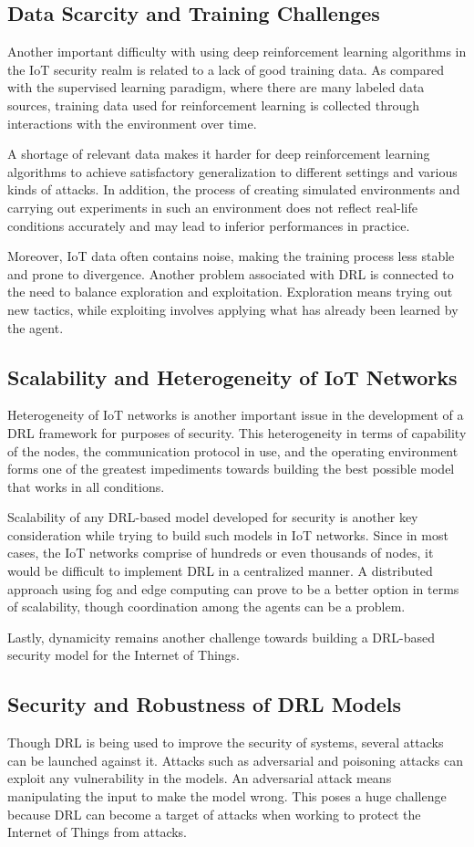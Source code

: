 \documentclass[12pt]{article}
\begin{document}
\subsection{Data Scarcity and Training Challenges}
Another important difficulty with using deep reinforcement learning algorithms in the IoT security realm is related to a lack of good training data. As compared with the supervised learning paradigm, where there are many labeled data sources, training data used for reinforcement learning is collected through interactions with the environment over time.

A shortage of relevant data makes it harder for deep reinforcement learning algorithms to achieve satisfactory generalization to different settings and various kinds of attacks. In addition, the process of creating simulated environments and carrying out experiments in such an environment does not reflect real-life conditions accurately and may lead to inferior performances in practice.

Moreover, IoT data often contains noise, making the training process less stable and prone to divergence. Another problem associated with DRL is connected to the need to balance exploration and exploitation. Exploration means trying out new tactics, while exploiting involves applying what has already been learned by the agent.
\subsection{Scalability and Heterogeneity of IoT Networks}
Heterogeneity of IoT networks is another important issue in the development of a DRL framework for purposes of security. This heterogeneity in terms of capability of the nodes, the communication protocol in use, and the operating environment forms one of the greatest impediments towards building the best possible model that works in all conditions.

Scalability of any DRL-based model developed for security is another key consideration while trying to build such models in IoT networks. Since in most cases, the IoT networks comprise of hundreds or even thousands of nodes, it would be difficult to implement DRL in a centralized manner. A distributed approach using fog and edge computing can prove to be a better option in terms of scalability, though coordination among the agents can be a problem.

Lastly, dynamicity remains another challenge towards building a DRL-based security model for the Internet of Things.
\subsection{Security and Robustness of DRL Models}
Though DRL is being used to improve the security of systems, several attacks can be launched against it. Attacks such as adversarial and poisoning attacks can exploit any vulnerability in the models. An adversarial attack means manipulating the input to make the model wrong. This poses a huge challenge because DRL can become a target of attacks when working to protect the Internet of Things from attacks.
\end{document}
